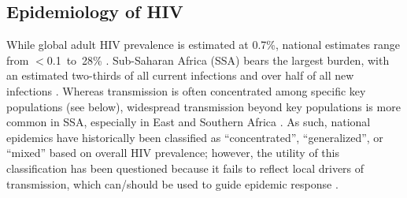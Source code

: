 \subsection{Epidemiology of HIV}\label{intro.hiv.epi}
While global adult HIV prevalence is estimated at 0.7\%,
national estimates range from $<$0.1~to~28\% \cite{AIDSinfo}.
Sub-Saharan Africa (SSA) bears the largest burden, with an estimated
two-thirds of all current infections and over half of all new infections \cite{AIDSinfo}.
Whereas transmission is often concentrated among specific key populations (see below),
widespread transmission beyond key populations is more common in SSA,
especially in East and Southern Africa \cite{Kilmarx2009,AIDSinfo}.
As such, national epidemics have historically been classified as
``concentrated'', ``generalized'', or ``mixed'' based on overall HIV prevalence;
however, the utility of this classification has been questioned because
it fails to reflect local drivers of transmission,
which can/should be used to guide epidemic response \cite{Mishra2012appr,Tanser2014,Boily2015}.
